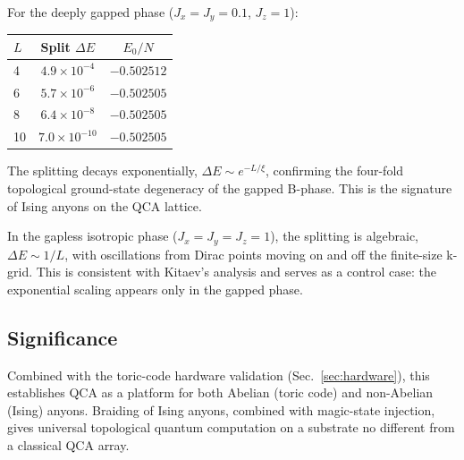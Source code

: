 For the deeply gapped phase ($J_x = J_y = 0.1$, $J_z = 1$):
\begin{center}
\begin{tabular}{lcc}
\hline
$L$ & Split $\Delta E$ & $E_0/N$ \\
\hline
4  & $4.9 \times 10^{-4}$ & $-0.502512$ \\
6  & $5.7 \times 10^{-6}$ & $-0.502505$ \\
8  & $6.4 \times 10^{-8}$ & $-0.502505$ \\
10 & $7.0 \times 10^{-10}$ & $-0.502505$ \\
\hline
\end{tabular}
\end{center}
The splitting decays exponentially, $\Delta E \sim e^{-L/\xi}$,
confirming the four-fold topological ground-state degeneracy of
the gapped B-phase.  This is the signature of Ising anyons on
the QCA lattice.

In the gapless isotropic phase ($J_x = J_y = J_z = 1$), the
splitting is algebraic, $\Delta E \sim 1/L$, with oscillations
from Dirac points moving on and off the finite-size k-grid.
This is consistent with Kitaev's analysis and serves as a
control case: the exponential scaling appears only in the
gapped phase.

\subsection{Significance}

Combined with the toric-code hardware validation
(Sec.~\ref{sec:hardware}), this establishes QCA as a platform
for both Abelian (toric code) and non-Abelian (Ising) anyons.
Braiding of Ising anyons, combined with magic-state injection,
gives universal topological quantum computation on a substrate
no different from a classical QCA array.
